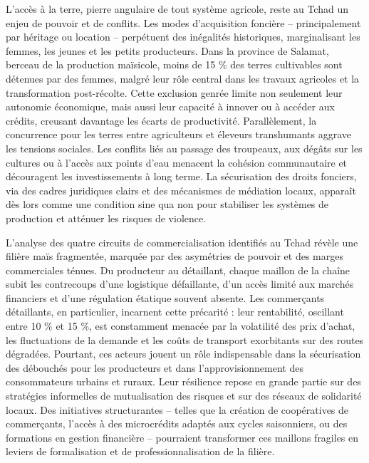 \documentclass[12pt,oneside]{report}
\begin{document}
L’accès à la terre, pierre angulaire de tout système agricole, reste au Tchad un enjeu de pouvoir et de conflits. Les modes d’acquisition foncière – principalement par héritage ou location – perpétuent des inégalités historiques, marginalisant les femmes, les jeunes et les petits producteurs. Dans la province de Salamat, berceau de la production maïsicole, moins de 15 \% des terres cultivables sont détenues par des femmes, malgré leur rôle central dans les travaux agricoles et la transformation post-récolte. Cette exclusion genrée limite non seulement leur autonomie économique, mais aussi leur capacité à innover ou à accéder aux crédits, creusant davantage les écarts de productivité. Parallèlement, la concurrence pour les terres entre agriculteurs et éleveurs transhumants aggrave les tensions sociales. Les conflits liés au passage des troupeaux, aux dégâts sur les cultures ou à l’accès aux points d’eau menacent la cohésion communautaire et découragent les investissements à long terme. La sécurisation des droits fonciers, via des cadres juridiques clairs et des mécanismes de médiation locaux, apparaît dès lors comme une condition sine qua non pour stabiliser les systèmes de production et atténuer les risques de violence.

L’analyse des quatre circuits de commercialisation identifiés au Tchad révèle une filière maïs fragmentée, marquée par des asymétries de pouvoir et des marges commerciales ténues. Du producteur au détaillant, chaque maillon de la chaîne subit les contrecoups d’une logistique défaillante, d’un accès limité aux marchés financiers et d’une régulation étatique souvent absente. Les commerçants détaillants, en particulier, incarnent cette précarité : leur rentabilité, oscillant entre 10 \% et 15 \%, est constamment menacée par la volatilité des prix d’achat, les fluctuations de la demande et les coûts de transport exorbitants sur des routes dégradées. Pourtant, ces acteurs jouent un rôle indispensable dans la sécurisation des débouchés pour les producteurs et dans l’approvisionnement des consommateurs urbains et ruraux. Leur résilience repose en grande partie sur des stratégies informelles de mutualisation des risques et sur des réseaux de solidarité locaux. Des initiatives structurantes – telles que la création de coopératives de commerçants, l’accès à des microcrédits adaptés aux cycles saisonniers, ou des formations en gestion financière – pourraient transformer ces maillons fragiles en leviers de formalisation et de professionnalisation de la filière.
\end{document}
